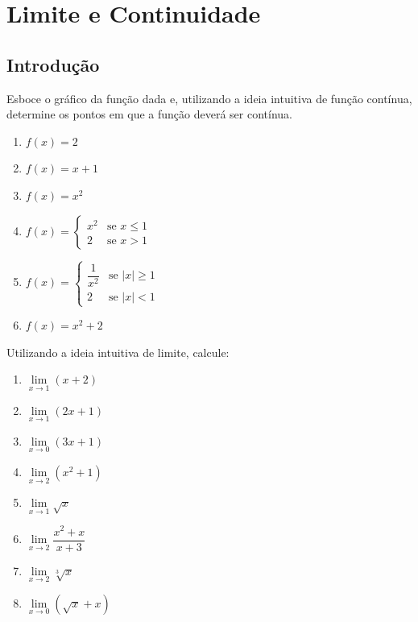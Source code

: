 \setcounter{section}{2}
\setcounter{subsection}{1}

\section{Limite e Continuidade}


\subsection{Introdução}

\begin{exercicio}[1]
Esboce o gráfico da função dada e, utilizando a ideia intuitiva de função contínua, determine os pontos em que a função deverá ser contínua.
\begin{enumerate}[label=\alph*)]
    \item $f(x) = 2$
    \item $f(x) = x + 1$
    \item $f(x) = x^2$
    \item $f(x) = \begin{cases} x^2 & \text{se } x \le 1 \\ 2 & \text{se } x > 1 \end{cases}$
    \item $f(x) = \begin{cases} \dfrac{1}{x^2} & \text{se } |x| \ge 1 \\ 2 & \text{se } |x| < 1 \end{cases}$
    \item $f(x) = x^2 + 2$
\end{enumerate}
\end{exercicio}

\begin{exercicio}[2]
Utilizando a ideia intuitiva de limite, calcule:
\begin{enumerate}[label=\alph*)]
    \item $\lim\limits_{x \to 1} (x + 2)$
    \item $\lim\limits_{x \to 1} (2x + 1)$
    \item $\lim\limits_{x \to 0} (3x + 1)$
    \item $\lim\limits_{x \to 2} (x^2 + 1)$
    \item $\lim\limits_{x \to 1} \sqrt{x}$
    \item $\lim\limits_{x \to 2} \dfrac{x^2 + x}{x + 3}$
    \item $\lim\limits_{x \to 2} \sqrt[3]{x}$
    \item $\lim\limits_{x \to 0} (\sqrt{x} + x)$
\end{enumerate}
\end{exercicio}

